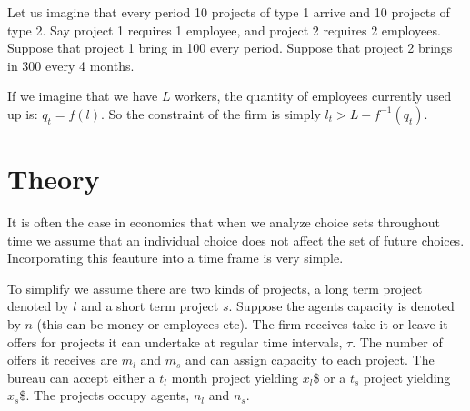 \documentclass[12pt]{report}
\numberwithin{equation}{section}
\DeclarePairedDelimiter\floor{\lfloor}{\rfloor}
\begin{document}
Let us imagine that every period 10 projects of type 1 arrive and 10 projects of type 2. Say project 1 requires 1 employee, and project 2 requires 2 employees. Suppose that project 1 bring in 100 every period. Suppose that project 2 brings in 300 every 4 months. 

If we imagine that we have $L$ workers, the quantity of employees currently used up is: $q_t=f(l)$. So the constraint of the firm is simply $l_t > L-f^{-1}(q_t)$. 

\section{Theory}

It is often the case in economics that when we analyze choice sets throughout time we assume that an individual choice does not affect the set of future choices. Incorporating this feauture into a time frame is very simple. 

\newpage

To simplify we assume there are two kinds of projects, a long term project denoted by $l$ and a short term project $s$. Suppose the agents capacity is denoted by $n$ (this can be money or employees etc). The firm receives take it or leave it offers for projects it can undertake at regular time intervals, $\tau$. The number of offers it receives are $m_l$ and $m_s$ and can assign capacity to each project. The bureau can accept either a $t_l$ month project yielding $x_l$\$ or a $t_s$ project yielding $x_s$\$. The projects occupy agents, $n_l$ and $n_s$. 

\end{document}
